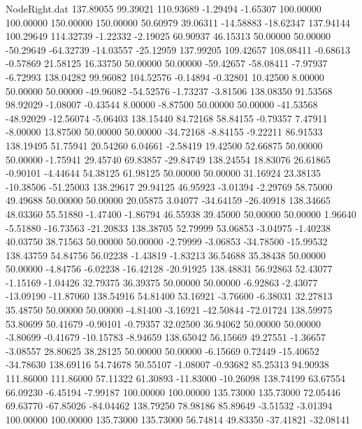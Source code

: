 \begin{filecontents}{NodeRight.dat}
 137.89055   99.39021  110.93689    -1.29494   -1.65307  100.00000  100.00000  150.00000  150.00000   50.60979   39.06311  -14.58883  -18.62347
 137.94144  100.29649  114.32739    -1.22332   -2.19025   60.90937   46.15313   50.00000   50.00000  -50.29649  -64.32739  -14.03557  -25.12959
 137.99205  109.42657  108.08411    -0.68613   -0.57869   21.58125   16.33750   50.00000   50.00000  -59.42657  -58.08411   -7.97937   -6.72993
 138.04282   99.96082  104.52576    -0.14894   -0.32801   10.42500    8.00000   50.00000   50.00000  -49.96082  -54.52576   -1.73237   -3.81506
 138.08350   91.53568   98.92029    -1.08007   -0.43544    8.00000   -8.87500   50.00000   50.00000  -41.53568  -48.92029  -12.56074   -5.06403
 138.15440   84.72168   58.84155    -0.79357    7.47911   -8.00000   13.87500   50.00000   50.00000  -34.72168   -8.84155   -9.22211   86.91533
 138.19495   51.75941   20.54260     6.04661   -2.58419   19.42500   52.66875   50.00000   50.00000   -1.75941   29.45740   69.83857  -29.84749
 138.24554   18.83076   26.61865    -0.90101   -4.44644   54.38125   61.98125   50.00000   50.00000   31.16924   23.38135  -10.38506  -51.25003
 138.29617   29.94125   46.95923    -3.01394   -2.29769   58.75000   49.49688   50.00000   50.00000   20.05875    3.04077  -34.64159  -26.40918
 138.34665   48.03360   55.51880    -1.47400   -1.86794   46.55938   39.45000   50.00000   50.00000    1.96640   -5.51880  -16.73563  -21.20833
 138.38705   52.79999   53.06853    -3.04975   -1.40238   40.03750   38.71563   50.00000   50.00000   -2.79999   -3.06853  -34.78500  -15.99532
 138.43759   54.84756   56.02238    -1.43819   -1.83213   36.54688   35.38438   50.00000   50.00000   -4.84756   -6.02238  -16.42128  -20.91925
 138.48831   56.92863   52.43077    -1.15169   -1.04426   32.79375   36.39375   50.00000   50.00000   -6.92863   -2.43077  -13.09190  -11.87060
 138.54916   54.81400   53.16921    -3.76600   -6.38031   32.27813   35.48750   50.00000   50.00000   -4.81400   -3.16921  -42.50844  -72.01724
 138.59975   53.80699   50.41679    -0.90101   -0.79357   32.02500   36.94062   50.00000   50.00000   -3.80699   -0.41679  -10.15783   -8.94659
 138.65042   56.15669   49.27551    -1.36657   -3.08557   28.80625   38.28125   50.00000   50.00000   -6.15669    0.72449  -15.40652  -34.78630
 138.69116   54.74678   50.55107    -1.08007   -0.93682   85.25313   94.90938  111.86000  111.86000   57.11322   61.30893  -11.83000  -10.26098
 138.74199   63.67554   66.09230    -6.45194   -7.99187  100.00000  100.00000  135.73000  135.73000   72.05446   69.63770  -67.85026  -84.04462
 138.79250   78.98186   85.89649    -3.51532   -3.01394  100.00000  100.00000  135.73000  135.73000   56.74814   49.83350  -37.41821  -32.08141

\end{filecontents}
